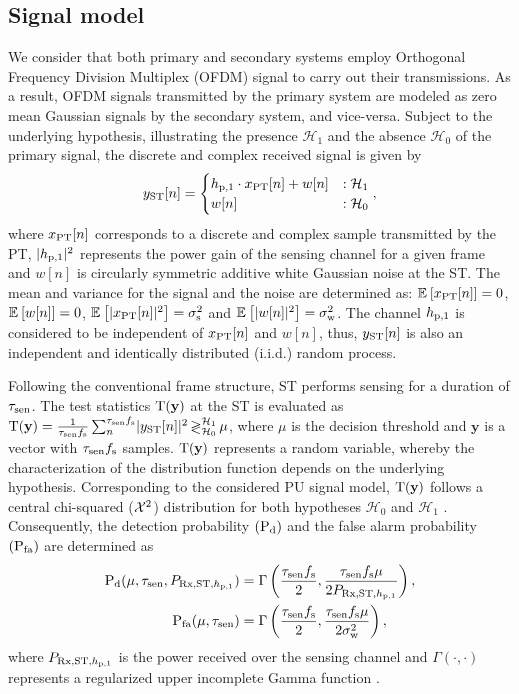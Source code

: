 
\subsection{Signal model}
We consider that both primary and secondary systems employ Orthogonal Frequency Division Multiplex (OFDM) signal to carry out their transmissions. As a result, OFDM signals transmitted by the primary system are modeled as zero mean Gaussian signals by the secondary system, and vice-versa. Subject to the underlying hypothesis, illustrating the presence $\mathcal H_1$ and the absence $\mathcal H_0$ of the primary signal, the discrete and complex received signal is given by 
\begin{equation}
\yrcvd[n] = 
\begin{cases}
\hpo \cdot \xp[n] + w[n] & : \mathcal{H}_1 \\
w[n] & :\mathcal{H}_0
\end{cases},
\label{eq:sig_mod_st}
\end{equation}
where $x_{\text{PT}}[n]$ corresponds to a discrete and complex sample transmitted by the PT, $|h_{\text{p,1}}|^2$ represents the power gain of the sensing channel for a given frame and $w[n]$ is circularly symmetric additive white Gaussian noise at the ST. 
The mean and variance for the signal and the noise are determined as: ${\mathbb E}_{}\left[ x_{\text{PT}}[n] \right] = 0$, ${\mathbb E}_{}\left[ w[n] \right] = 0$, ${\mathbb E}_{}\left[ |x_{\text{PT}}[n]|^2 \right] = \sigma^2_{\text{s}}$ and ${\mathbb E}_{}\left[ |w[n]|^2 \right] = \sigma^2_{\text{w}}$. 
The channel $h_{\text{p,1}}$ is considered to be independent of $x_{\text{PT}}[n]$ and $w[n]$, thus, $y_{\text{ST}}[n]$ is also an independent and identically distributed (i.i.d.) random process.

Following the conventional frame structure, ST performs sensing for a duration of $\tau_{\text{sen}}$. The test statistics $\operatorname*{\text{T}(\textbf{y})}$ at the ST is evaluated as $\operatorname*{\text{T}(\textbf{y})} = {\frac{1}{{\tau_{\text{sen}} f_{\text{s}}}}\sum_n^{\tau_{\text{sen}} f_{\text{s}}}} { |y_{\text{ST}}[n]|^2} \mathop{\gtrless}_{\mathcal{H}_0}^{\mathcal{H}_1} \mu$, where $\mu$ is the decision threshold and $\textbf{y}$ is a vector with $\tau_{\text{sen}} f_{\text{s}}$ samples. $\operatorname*{\text{T}(\textbf{y})}$ represents a random variable, whereby the characterization of the distribution function depends on the underlying hypothesis. Corresponding to the considered PU signal model, $\operatorname*{\text{T}(\textbf{y})}$ follows a central chi-squared ($\cchi2$) distribution for both hypotheses $\mathcal H_0$ and $\mathcal H_1$ \cite{Kay}.
Consequently, the detection probability $(\text{P}_{\text{d}})$ and the false alarm probability $(\text{P}_{\text{fa}})$ are determined as \cite{Tan08}
\begin{align}
\pd(\mu, \tsen, \prcvdstpt) &= \Gamma\left( \frac{\tsen \fsam}{2}, \frac{\tsen \fsam \mu}{2 \prcvdstpt} \right),  \label{eq:pd} \\ 
\pfa(\mu, \tsen) &= \Gamma\left( \frac{\tsen \fsam}{2}, \frac{\tsen \fsam \mu}{2 \npo} \right),  \label{eq:pfa} 
\end{align}
where $P_{\text{Rx,ST,$h_{\text{p,1}}$}}$ is the power received over the sensing channel and $\Gamma(\cdot, \cdot)$ represents a regularized upper incomplete Gamma function \cite{grad}.

